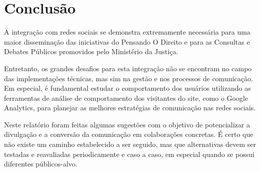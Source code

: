 \chapter{Conclusão}
A integração com redes sociais se demonstra extremamente necessária para uma maior disseminação das iniciativas do Pensando O Direito e para as Consultas e Debates Públicos promovidos pelo Ministério da Justiça.

Entretanto, os grandes desafios para esta integração não se encontram no campo das implementações técnicas, mas sim na gestão e nos processos de comunicação. Em especial, é fundamental estudar o comportamento dos usuários utilizando as ferramentas de análise de comportamento dos visitantes do site, como o Google Analytics, para planejar as melhores estratégias de comunicação nas redes sociais.

Neste relatório foram feitas algumas sugestões com o objetivo de potencializar a divulgação e a conversão da comunicação em colaborações concretas. É certo que não existe um caminho estabelecido a ser seguido, mas que alternativas devem ser testadas e reavaliadas periodicamente e caso a caso, em especial quando se possui diferentes públicos-alvo. 